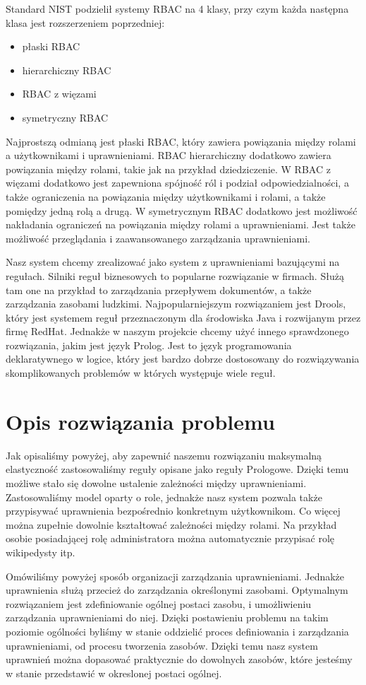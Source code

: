 \documentclass{classrep}
\begin{document}
Standard NIST podzielił systemy RBAC na 4 klasy, przy czym każda następna klasa jest rozszerzeniem poprzedniej:
\begin{itemize}
\item płaski RBAC
\item hierarchiczny RBAC
\item RBAC z więzami
\item symetryczny RBAC
\end{itemize}
Najprostszą odmianą jest płaski RBAC, który zawiera powiązania między rolami a użytkownikami i uprawnieniami. RBAC hierarchiczny dodatkowo zawiera powiązania między rolami,
takie jak na przykład dziedziczenie. W RBAC z więzami dodatkowo jest zapewniona spójność ról i podział odpowiedzialności, a także ograniczenia na powiązania między użytkownikami
i rolami, a także pomiędzy jedną rolą a drugą. W symetrycznym RBAC dodatkowo jest możliwość nakładania ograniczeń na powiązania między rolami a uprawnieniami. Jest także możliwość przeglądania
i zaawansowanego zarządzania uprawnieniami.

Nasz system chcemy zrealizować jako system z uprawnieniami bazującymi na regułach. Silniki reguł biznesowych to popularne rozwiązanie w firmach. Służą tam one na przykład to zarządzania
przepływem dokumentów, a także zarządzania zasobami ludzkimi. Najpopularniejszym rozwiązaniem jest Drools\cite{Drools}, który jest systemem reguł przeznaczonym dla środowiska Java i rozwijanym
przez firmę RedHat. Jednakże w naszym projekcie chcemy użyć innego sprawdzonego rozwiązania, jakim jest język Prolog\cite{Prolog}. Jest to język programowania deklaratywnego w logice,
który jest bardzo dobrze dostosowany do rozwiązywania skomplikowanych problemów w których występuje wiele reguł. 
\section{Opis rozwiązania problemu}
Jak opisaliśmy powyżej, aby zapewnić naszemu rozwiązaniu maksymalną elastyczność zastosowaliśmy reguły opisane jako reguły Prologowe. Dzięki temu możliwe stało się dowolne ustalenie zależności
między uprawnieniami. Zastosowaliśmy model oparty o role, jednakże nasz system pozwala także przypisywać uprawnienia bezpośrednio konkretnym użytkownikom. Co więcej można zupełnie
dowolnie kształtować zależności między rolami. Na przykład osobie posiadającej rolę administratora można automatycznie przypisać rolę wikipedysty itp.

Omówiliśmy powyżej sposób organizacji zarządzania uprawnieniami. Jednakże uprawnienia służą przecież do zarządzania określonymi zasobami. Optymalnym rozwiązaniem jest
zdefiniowanie ogólnej postaci zasobu, i umożliwieniu zarządzania uprawnieniami do niej. Dzięki postawieniu problemu na takim poziomie ogólności byliśmy w stanie oddzielić proces
definiowania i zarządzania uprawnieniami, od procesu tworzenia zasobów. Dzięki temu nasz system uprawnień można dopasować praktycznie do dowolnych zasobów, które jesteśmy w stanie
przedstawić w okreslonej postaci ogólnej. 
\end{document}
